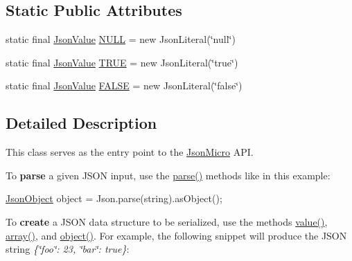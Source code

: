 \subsection*{Static Public Attributes}
\begin{DoxyCompactItemize}
\item 
static final \hyperlink{classcom_1_1ingeniigroup_1_1stratux_1_1_tools_1_1_json_micro_1_1_json_value}{Json\+Value} \hyperlink{classcom_1_1ingeniigroup_1_1stratux_1_1_tools_1_1_json_micro_1_1_json_a099662304478d72f17898081eead1b67}{N\+U\+LL} = new Json\+Literal(\char`\"{}null\char`\"{})
\item 
static final \hyperlink{classcom_1_1ingeniigroup_1_1stratux_1_1_tools_1_1_json_micro_1_1_json_value}{Json\+Value} \hyperlink{classcom_1_1ingeniigroup_1_1stratux_1_1_tools_1_1_json_micro_1_1_json_a8123cf7272ded3c560cc7b6af000728e}{T\+R\+UE} = new Json\+Literal(\char`\"{}true\char`\"{})
\item 
static final \hyperlink{classcom_1_1ingeniigroup_1_1stratux_1_1_tools_1_1_json_micro_1_1_json_value}{Json\+Value} \hyperlink{classcom_1_1ingeniigroup_1_1stratux_1_1_tools_1_1_json_micro_1_1_json_a4fb5c1be6ce53fd416297b03ff5cf34f}{F\+A\+L\+SE} = new Json\+Literal(\char`\"{}false\char`\"{})
\end{DoxyCompactItemize}


\subsection{Detailed Description}
This class serves as the entry point to the \hyperlink{namespacecom_1_1ingeniigroup_1_1stratux_1_1_tools_1_1_json_micro}{Json\+Micro} A\+PI. 

To {\bfseries parse} a given J\+S\+ON input, use the {\ttfamily \hyperlink{classcom_1_1ingeniigroup_1_1stratux_1_1_tools_1_1_json_micro_1_1_json_a0d4456dc115b1540337d2475ed2e3d55}{parse()}} methods like in this example\+: 


\begin{DoxyPre}
\hyperlink{classcom_1_1ingeniigroup_1_1stratux_1_1_tools_1_1_json_micro_1_1_json_object}{JsonObject} object = Json.parse(string).asObject();
\end{DoxyPre}
 

To {\bfseries create} a J\+S\+ON data structure to be serialized, use the methods {\ttfamily \hyperlink{classcom_1_1ingeniigroup_1_1stratux_1_1_tools_1_1_json_micro_1_1_json_aa7a17dbf2bbb667284cb5a86d404bf6d}{value()}}, {\ttfamily \hyperlink{classcom_1_1ingeniigroup_1_1stratux_1_1_tools_1_1_json_micro_1_1_json_a5eb11ae96fc3a678d555537c65a6e323}{array()}}, and {\ttfamily \hyperlink{classcom_1_1ingeniigroup_1_1stratux_1_1_tools_1_1_json_micro_1_1_json_af00c51eafc3d4e8f87ce07660acfbaae}{object()}}. For example, the following snippet will produce the J\+S\+ON string {\itshape \{\char`\"{}foo\char`\"{}\+: 23, \char`\"{}bar\char`\"{}\+: true\}}\+: 


